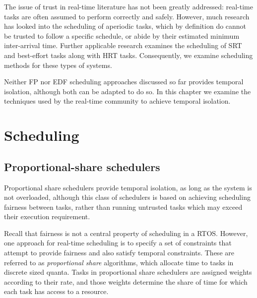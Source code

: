 The issue of trust in real-time literature has not been greatly addressed: real-time tasks are often
assumed to perform correctly and safely.  However, much research has looked into the scheduling of
aperiodic tasks, which by definition do cannot be trusted to follow a specific schedule, or abide by
their estimated minimum inter-arrival time. Further applicable research examines the scheduling of
\gls{SRT} and best-effort tasks along with \gls{HRT} tasks. Consequently, we examine scheduling methods for
these types of systems. 

Neither \gls{FP} nor \gls{EDF} scheduling
approaches discussed so far provides temporal isolation, although both can be adapted to do so.  In
this chapter we examine the techniques used by the real-time community to achieve temporal
isolation.


\section{Scheduling}


\subsection{Proportional-share schedulers}
\label{s:pfair}

Proportional share schedulers provide temporal isolation, as long as the system is not overloaded,
although this class of schedulers is based on achieving scheduling fairness between tasks, rather
than running untrusted tasks which may exceed their execution requirement. 

Recall that fairness is not a central property of scheduling in a \acrlong{RTOS}. However, one approach
for real-time scheduling is to specify a set of constraints that attempt to provide fairness and
also satisfy temporal constraints.  These are referred to as \emph{proportional share} algorithms,
which allocate time to tasks in discrete sized quanta. Tasks in proportional share schedulers are assigned 
weights according to their rate, and those weights determine the share of time for which each task 
has access to a resource.

